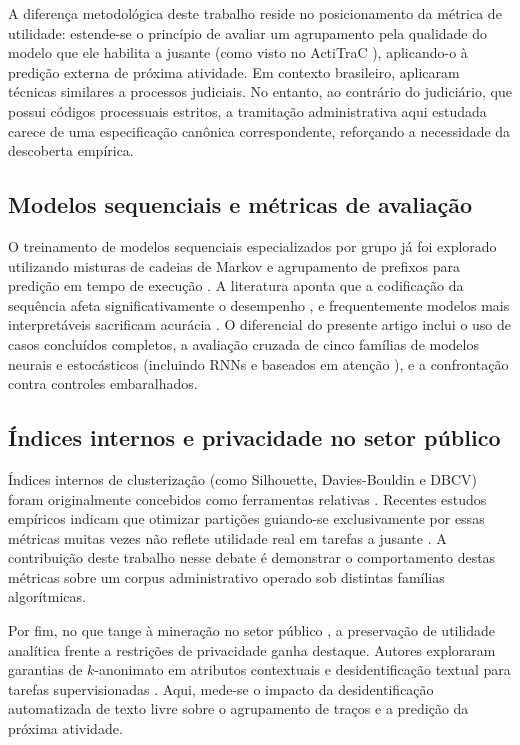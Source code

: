 A diferença metodológica deste trabalho reside no posicionamento da métrica de utilidade: estende-se o princípio de avaliar um agrupamento pela qualidade do modelo que ele habilita a jusante (como visto no ActiTraC \cite{deweerdt2013actitrac}), aplicando-o à predição externa de próxima atividade. Em contexto brasileiro,  aplicaram técnicas similares a processos judiciais. No entanto, ao contrário do judiciário, que possui códigos processuais estritos, a tramitação administrativa aqui estudada carece de uma especificação canônica correspondente, reforçando a necessidade da descoberta empírica.

\subsection{Modelos sequenciais e métricas de avaliação}
\label{sec:rev-sequencia}

O treinamento de modelos sequenciais especializados por grupo já foi explorado utilizando misturas de cadeias de Markov \cite{ferreira2007sequence} e agrupamento de prefixos para predição em tempo de execução \cite{difrancescomarino2019clusteringppm}. A literatura aponta que a codificação da sequência afeta significativamente o desempenho \cite{teinemaa2019outcome}, e frequentemente modelos mais interpretáveis sacrificam acurácia \cite{tax2020interdisciplinary}. O diferencial do presente artigo inclui o uso de casos concluídos completos, a avaliação cruzada de cinco famílias de modelos neurais e estocásticos (incluindo RNNs \cite{tax2017lstm} e baseados em atenção \cite{bukhsh2021processtransformer}), e a confrontação contra controles embaralhados.

\subsection{Índices internos e privacidade no setor público}
\label{sec:rev-indices}

Índices internos de clusterização (como Silhouette, Davies-Bouldin e DBCV) foram originalmente concebidos como ferramentas relativas \cite{rousseeuw1987silhouettes, moulavi2014dbcv}. Recentes estudos empíricos indicam que otimizar partições guiando-se exclusivamente por essas métricas muitas vezes não reflete utilidade real em tarefas a jusante \cite{yerbury2025rvi, gagolewski2021invalid, vonluxburg2012clustering}. A contribuição deste trabalho nesse debate é demonstrar o comportamento destas métricas sobre um corpus administrativo operado sob distintas famílias algorítmicas.

Por fim, no que tange à mineração no setor público \cite{vanderaalst2010auditing, araujo2023mineracao}, a preservação de utilidade analítica frente a restrições de privacidade ganha destaque. Autores exploraram garantias de $k$-anonimato em atributos contextuais \cite{fahrenkrogpetersen2020pripel, ferrao2022utility} e desidentificação textual para tarefas supervisionadas \cite{lothritz2023evaluating}. Aqui, mede-se o impacto da desidentificação automatizada de texto livre sobre o agrupamento de traços e a predição da próxima atividade.